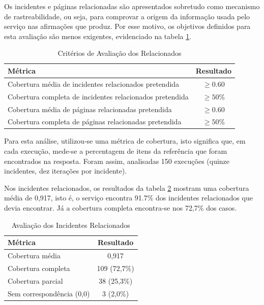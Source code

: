 		Os incidentes e páginas relacionadas são apresentados sobretudo como mecanismo de rastreabilidade, ou seja, para comprovar a origem da informação usada pelo serviço nas afirmações que produz. Por esse motivo, os objetivos definidos para esta avaliação são menos exigentes, evidenciado na tabela \ref{tab:classificacao-relacionados}.
		
		\begin{table}[H]
			\centering
			\small
			\begin{tabular}{lc}
				\hline
				\textbf{Métrica} & \textbf{Resultado} \\
				\hline
				Cobertura média de incidentes relacionados pretendida & $\geq0.60$ \\
				\hline
				Cobertura completa de incidentes relacionados pretendida & $\geq50\%$ \\
				\hline
				Cobertura média de páginas relacionadas pretendida & $\geq0.60$ \\
				\hline
				Cobertura completa de páginas relacionadas pretendida & $\geq50\%$ \\
				\hline
			\end{tabular}
			\caption[Critérios de Avaliação dos Relacionados]{Critérios de Avaliação dos Relacionados}
			\label{tab:classificacao-relacionados}
		\end{table}
	
		Para esta análise, utilizou-se uma métrica de cobertura, isto significa que, em cada execução, mede-se a percentagem de itens da referência que foram encontrados na resposta. Foram assim, analisadas 150 execuções (quinze incidentes, dez iterações por incidente).
		
		Nos incidentes relacionados, os resultados da tabela \ref{tab:avaliacao-incidentes-relacionados} mostram uma cobertura média de 0,917, isto é, o serviço encontra 91.7\% dos incidentes relacionados que devia encontrar. Já a cobertura completa encontra-se nos 72,7\% dos casos.
		
		\begin{table}[H]
			\centering
			\small
			\begin{tabular}{lc}
				\hline
				\textbf{Métrica} & \textbf{Resultado} \\
				\hline
				Cobertura média & 0,917 \\
				\hline
				Cobertura completa & 109 (72,7\%) \\
				\hline
				Cobertura parcial & 38 (25,3\%) \\
				\hline
				Sem correspondência (0,0) & 3 (2,0\%) \\
				\hline
			\end{tabular}
			\caption[Avaliação dos Incidentes Relacionados]{Avaliação dos Incidentes Relacionados}
			\label{tab:avaliacao-incidentes-relacionados}
		\end{table}
		
